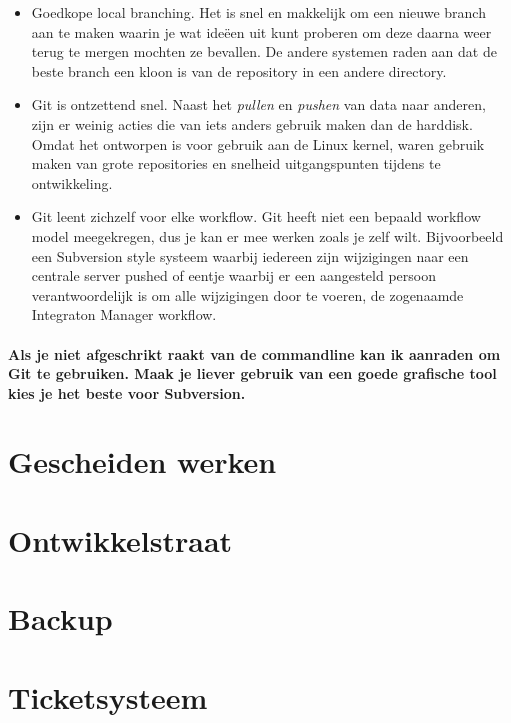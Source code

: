 \begin{itemize}
  \item Goedkope local branching. Het is snel en makkelijk om een nieuwe branch aan te maken waarin je wat ide\"{e}en uit kunt proberen om deze daarna weer terug te mergen mochten ze bevallen. De andere systemen raden aan dat de beste branch een kloon is van de repository in een andere directory.
  \item Git is ontzettend snel. Naast het \emph{pullen} en \emph{pushen} van data naar anderen, zijn er weinig acties die van iets anders gebruik maken dan de harddisk. Omdat het ontworpen is voor gebruik aan de Linux kernel, waren gebruik maken van grote repositories en snelheid uitgangspunten tijdens te ontwikkeling.
  \item Git leent zichzelf voor elke workflow. Git heeft niet een bepaald workflow model meegekregen, dus je kan er mee werken zoals je zelf wilt. Bijvoorbeeld een Subversion style systeem waarbij iedereen zijn wijzigingen naar een centrale server pushed of eentje waarbij er een aangesteld persoon verantwoordelijk is om alle wijzigingen door te voeren, de zogenaamde Integraton Manager workflow.
\end{itemize}

\paragraph{Als je niet afgeschrikt raakt van de commandline kan ik aanraden om Git te gebruiken. Maak je liever gebruik van een goede grafische tool kies je het beste voor Subversion.}

\section{Gescheiden werken}



\section{Ontwikkelstraat}



\section{Backup}



\section{Ticketsysteem}



